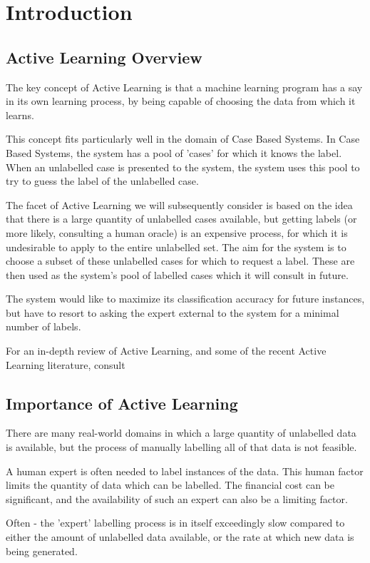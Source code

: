 \documentclass[a4paper,11pt]{report}
\begin{document}
\tableofcontents

\chapter{Introduction}
\section{Active Learning Overview}
The key concept of Active Learning is that a machine learning program has a say in its own learning process, by being capable of choosing the data from which it learns. 

This concept fits particularly well in the domain of Case Based Systems. In Case Based Systems, the system has a pool of 'cases' for which it knows the label. When an unlabelled case is presented to the system, the system uses this pool to try to guess the label of the unlabelled case.

The facet of Active Learning we will subsequently consider is based on the idea that there is a large quantity of unlabelled cases available, but getting labels (or more likely, consulting a human oracle) is an expensive process, for which it is undesirable to apply to the entire unlabelled set. The aim for the system is to choose a subset of these unlabelled cases for which to request a label. These are then used as the system's pool of labelled cases which it will consult in future.

The system would like to maximize its classification accuracy for future instances, but have to resort to asking the expert external to the system for a minimal number of labels.

For an in-depth review of Active Learning, and some of the recent Active Learning literature, consult \citep{Settles2010}


\section{Importance of Active Learning}
There are many real-world domains in which a large quantity of unlabelled data is available, but the process of manually labelling all of that data is not feasible. 

A human expert is often needed to label instances of the data. This human factor limits the quantity of data which can be labelled. The financial cost can be significant, and the availability of such an expert can also be a limiting factor.

Often - the 'expert' labelling process is in itself exceedingly slow compared to either the amount of unlabelled data available, or the rate at which new data is being generated. 
\end{document}
